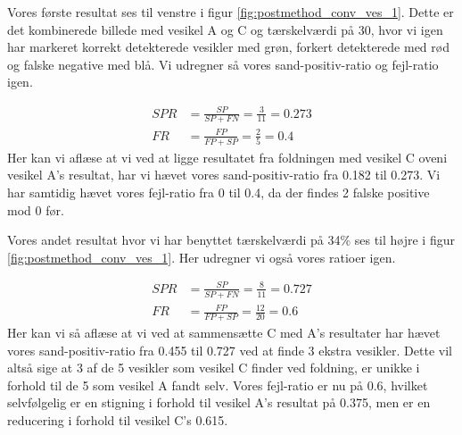 Vores første resultat ses til venstre i figur \ref{fig:postmethod_conv_ves_1}. Dette er det kombinerede billede med vesikel A og C og tærskelværdi på 30, hvor vi igen har markeret korrekt detekterede vesikler med grøn, forkert detekterede med rød og falske negative med blå. Vi udregner så vores sand-positiv-ratio og fejl-ratio igen.

\begin{align}
	SPR &= \frac{SP}{SP+FN} = \frac{3}{11} = 0.273\\
	FR &= \frac{FP}{FP+SP} = \frac{2}{5} = 0.4
\end{align}
Her kan vi aflæse at vi ved at ligge resultatet fra foldningen med vesikel C oveni vesikel A's resultat, har vi hævet vores sand-positiv-ratio fra 0.182 til 0.273. Vi har samtidig hævet vores fejl-ratio fra 0 til 0.4, da der findes 2 falske positive mod 0 før.  

Vores andet resultat hvor vi har benyttet tærskelværdi på 34\% ses til højre i figur \ref{fig:postmethod_conv_ves_1}. Her udregner vi også vores ratioer igen.

\begin{align}
	SPR &= \frac{SP}{SP+FN} = \frac{8}{11} = 0.727\\
	FR &= \frac{FP}{FP+SP} = \frac{12}{20} = 0.6
\end{align}
Her kan vi så aflæse at vi ved at sammensætte C med A's resultater har hævet vores sand-positiv-ratio fra 0.455 til 0.727 ved at finde 3 ekstra vesikler. Dette vil altså sige at 3 af de 5 vesikler som vesikel C finder ved foldning, er unikke i forhold til de 5 som vesikel A fandt selv. Vores fejl-ratio er nu på 0.6, hvilket selvfølgelig er en stigning i forhold til vesikel A's resultat på 0.375, men er en reducering i forhold til vesikel C's 0.615. 

